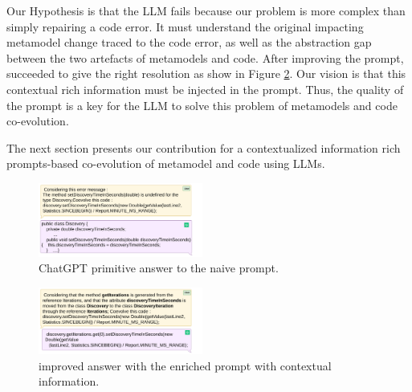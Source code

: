 Our Hypothesis is that the LLM fails because our problem is more complex than simply repairing a code error. It must understand the original impacting metamodel change traced to the code error, as well as the abstraction gap between the two artefacts of metamodels and code. After improving the prompt, \LLM succeeded to give the right resolution as show in Figure \ref{fig: chatgptimprovedanswer}.
Our vision is that this contextual rich information must be injected in the prompt.
Thus, the quality of the prompt is a key for the LLM to solve this problem of metamodels and code co-evolution. %

%
The next section presents our contribution for a contextualized information rich prompts-based co-evolution of metamodel and code using LLMs.  


\begin{figure}[t]
	\centering
	\includegraphics[width=0.48\textwidth]{./pics/chapter3pics/chatgptprimitiveanswer.png}
	\caption{ChatGPT primitive answer to the naive prompt.}
	\label{fig: chatgptanswer}
\end{figure}

\begin{figure}[t]
	\centering
	\includegraphics[width=0.48\textwidth]{./pics/chapter3pics/chatgptimprivedanswer.png}
	\caption{\LLM improved answer with the enriched prompt with contextual information.}
	\label{fig: chatgptimprovedanswer}
	\vspace{-5mm}
\end{figure}
